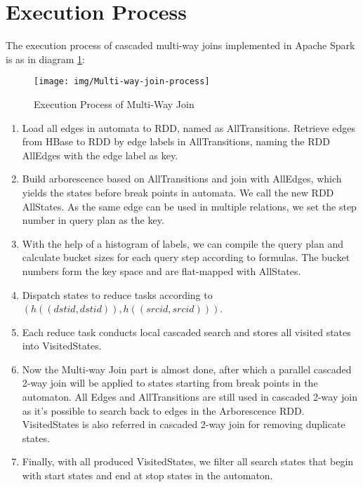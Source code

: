 \section{Execution Process}
The execution process of cascaded multi-way joins implemented in Apache Spark is as in diagram \ref{fig:multi-way-join-spark}:
\begin{figure}[h!]
  \caption{Execution Process of Multi-Way Join}
  \label{fig:multi-way-join-spark}
  \centering
    \texttt{[image: img/Multi-way-join-process]}
\end{figure}
\begin{enumerate}
    \item Load all edges in automata to RDD, named as AllTransitions. Retrieve edges from HBase to RDD by edge labels in AllTransitions, naming the RDD AllEdges with the edge label as key.
    \item Build arborescence based on AllTransitions and join with AllEdges, which yields the states before break points in automata. We call the new RDD AllStates. As the same edge can be used in multiple relations, we set the step number in query plan as the key.
    \item With the help of a histogram of labels, we can compile the query plan and calculate bucket sizes for each query step according to formulas. The bucket numbers form the key space and are flat-mapped with AllStates.
    \item Dispatch states to reduce tasks according to $(h((dstid,dstid)),h((srcid,srcid)))$.
    \item Each reduce task conducts local cascaded search and stores all visited states into VisitedStates.
    \item Now the Multi-way Join part is almost done, after which a parallel cascaded 2-way join will be applied to states starting from break points in the automaton. All Edges and AllTransitions are still used in cascaded 2-way join as it's possible to search back to edges in the Arborescence RDD. VisitedStates is also referred in cascaded 2-way join for removing duplicate states.
    \item Finally, with all produced VisitedStates, we filter all search states that begin with start states and end at stop states in the automaton.
\end{enumerate}
